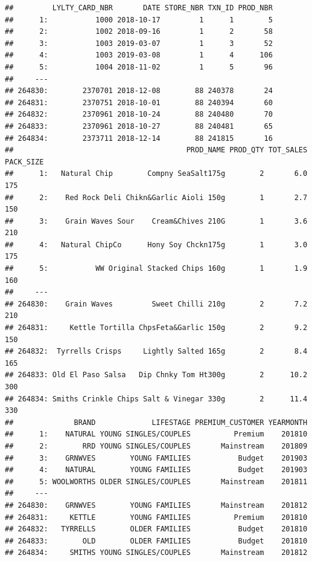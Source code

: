\documentclass[
]{article}
\begin{document}
\begin{verbatim}
##         LYLTY_CARD_NBR       DATE STORE_NBR TXN_ID PROD_NBR
##      1:           1000 2018-10-17         1      1        5
##      2:           1002 2018-09-16         1      2       58
##      3:           1003 2019-03-07         1      3       52
##      4:           1003 2019-03-08         1      4      106
##      5:           1004 2018-11-02         1      5       96
##     ---                                                    
## 264830:        2370701 2018-12-08        88 240378       24
## 264831:        2370751 2018-10-01        88 240394       60
## 264832:        2370961 2018-10-24        88 240480       70
## 264833:        2370961 2018-10-27        88 240481       65
## 264834:        2373711 2018-12-14        88 241815       16
##                                        PROD_NAME PROD_QTY TOT_SALES PACK_SIZE
##      1:   Natural Chip        Compny SeaSalt175g        2       6.0       175
##      2:    Red Rock Deli Chikn&Garlic Aioli 150g        1       2.7       150
##      3:    Grain Waves Sour    Cream&Chives 210G        1       3.6       210
##      4:   Natural ChipCo      Hony Soy Chckn175g        1       3.0       175
##      5:           WW Original Stacked Chips 160g        1       1.9       160
##     ---                                                                      
## 264830:    Grain Waves         Sweet Chilli 210g        2       7.2       210
## 264831:     Kettle Tortilla ChpsFeta&Garlic 150g        2       9.2       150
## 264832:  Tyrrells Crisps     Lightly Salted 165g        2       8.4       165
## 264833: Old El Paso Salsa   Dip Chnky Tom Ht300g        2      10.2       300
## 264834: Smiths Crinkle Chips Salt & Vinegar 330g        2      11.4       330
##              BRAND             LIFESTAGE PREMIUM_CUSTOMER YEARMONTH
##      1:    NATURAL YOUNG SINGLES/COUPLES          Premium    201810
##      2:        RRD YOUNG SINGLES/COUPLES       Mainstream    201809
##      3:    GRNWVES        YOUNG FAMILIES           Budget    201903
##      4:    NATURAL        YOUNG FAMILIES           Budget    201903
##      5: WOOLWORTHS OLDER SINGLES/COUPLES       Mainstream    201811
##     ---                                                            
## 264830:    GRNWVES        YOUNG FAMILIES       Mainstream    201812
## 264831:     KETTLE        YOUNG FAMILIES          Premium    201810
## 264832:   TYRRELLS        OLDER FAMILIES           Budget    201810
## 264833:        OLD        OLDER FAMILIES           Budget    201810
## 264834:     SMITHS YOUNG SINGLES/COUPLES       Mainstream    201812
\end{verbatim}
\end{document}
